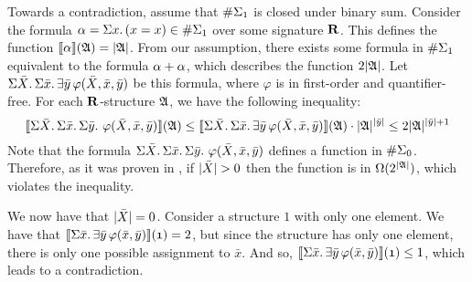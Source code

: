Towards a contradiction, assume that $\#\Sigma_{1}$ is closed under binary sum. 
Consider the formula $\alpha = \Sigma{x}.\,(x = x) \in \#\Sigma_{1}$ over some signature $\mathbf{R}$. 
This defines the function ${\llbracket{}{\alpha}\rrbracket}(\mathfrak{A}) = \vert \mathfrak{A} \vert$. 
From our assumption, there exists some formula in $\#\Sigma_{1}$ equivalent to the formula $\alpha + \alpha$, which describes the function $2\vert \mathfrak{A} \vert$. 
Let $\Sigma{\bar{X}}.\,\Sigma{\bar{x}}.\,\exists\bar{y}\,\varphi(\bar{X},\bar{x},\bar{y})$ be this formula, where $\varphi$ is in first-order and quantifier-free. 
For each $\mathbf{R}$-structure $\mathfrak{A}$, we have the following inequality:
$$
{\llbracket{}{\Sigma{\bar{X}}.\,\Sigma{\bar{x}}.\,\Sigma{\bar{y}}.\,\,\varphi(\bar{X},\bar{x},\bar{y})}\rrbracket}(\mathfrak{A})
\leq 
{\llbracket{}{\Sigma{\bar{X}}.\,\Sigma{\bar{x}}.\,\exists\bar{y}\,\varphi(\bar{X},\bar{x},\bar{y})}\rrbracket}(\mathfrak{A}) \cdot  \vert \mathfrak{A} \vert^{\vert \bar{y} \vert} \leq 2\vert \mathfrak{A} \vert^{\vert \bar{y} \vert+1} 
$$
Note that the formula $\Sigma{\bar{X}}.\,\Sigma{\bar{x}}.\,\Sigma{\bar{y}}.\,\,\varphi(\bar{X},\bar{x},\bar{y})$ defines a function in $\#\Sigma_{0}$. 
Therefore, as it was proven in \cite{SalujaST95}, if $\vert \bar{X} \vert > 0$ then the function is in $\Omega(2^{\vert \mathfrak{A} \vert})$, which violates the inequality.

We now have that $\vert \bar{X} \vert = 0$. 
Consider a structure $\mathfrak{1}$ with only one element. 
We have that ${\llbracket{}{\Sigma{\bar{x}}.\,\exists\bar{y}\,\varphi(\bar{x},\bar{y})}\rrbracket}(\mathfrak{1}) = 2$, but since the structure has only one element, there is only one possible assignment to $\bar{x}$. 
And so, ${\llbracket{}{\Sigma{\bar{x}}.\,\exists\bar{y}\,\varphi(\bar{x},\bar{y})}\rrbracket}(\mathfrak{1}) \leq 1$, which leads to a contradiction.
